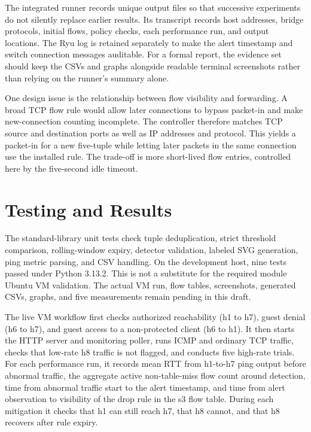 \documentclass[conference]{IEEEtran}
\begin{document}
The integrated runner records unique output files so that successive experiments do not silently replace earlier results. Its transcript records host addresses, bridge protocols, initial flows, policy checks, each performance run, and output locations. The Ryu log is retained separately to make the alert timestamp and switch connection messages auditable. For a formal report, the evidence set should keep the CSVs and graphs alongside readable terminal screenshots rather than relying on the runner's summary alone.

One design issue is the relationship between flow visibility and forwarding. A broad TCP flow rule would allow later connections to bypass packet-in and make new-connection counting incomplete. The controller therefore matches TCP source and destination ports as well as IP addresses and protocol. This yields a packet-in for a new five-tuple while letting later packets in the same connection use the installed rule. The trade-off is more short-lived flow entries, controlled here by the five-second idle timeout.

\section{Testing and Results}
The standard-library unit tests check tuple deduplication, strict threshold comparison, rolling-window expiry, detector validation, labeled SVG generation, ping metric parsing, and CSV handling. On the development host, nine tests passed under Python 3.13.2. This is not a substitute for the required module Ubuntu VM validation. The actual VM run, flow tables, screenshots, generated CSVs, graphs, and five measurements remain pending in this draft.

The live VM workflow first checks authorized reachability (h1 to h7), guest denial (h6 to h7), and guest access to a non-protected client (h6 to h1). It then starts the HTTP server and monitoring poller, runs ICMP and ordinary TCP traffic, checks that low-rate h8 traffic is not flagged, and conducts five high-rate trials. For each performance run, it records mean RTT from h1-to-h7 ping output before abnormal traffic, the aggregate active non-table-miss flow count around detection, time from abnormal traffic start to the alert timestamp, and time from alert observation to visibility of the drop rule in the s3 flow table. During each mitigation it checks that h1 can still reach h7, that h8 cannot, and that h8 recovers after rule expiry.
\end{document}
